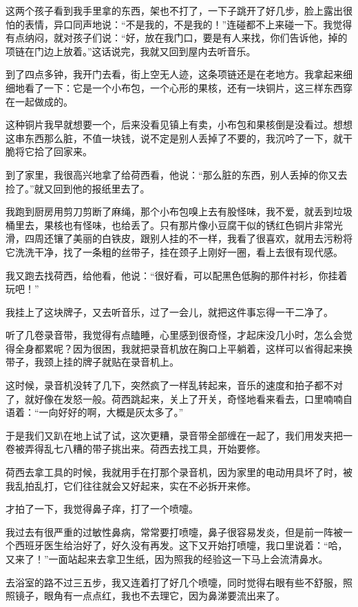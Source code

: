 \par 这两个孩子看到我手里拿的东西，架也不打了，一下子跳开了好几步，脸上露出很怕的表情，异口同声地说：“不是我的，不是我的！”连碰都不上来碰一下。我觉得有点纳闷，就对孩子们说：“好，放在我门口，要是有人来找，你们告诉他，掉的项链在门边上放着。”这话说完，我就又回到屋内去听音乐。
\par 到了四点多钟，我开门去看，街上空无人迹，这条项链还是在老地方。我拿起来细细地看了一下：它是一个小布包，一个心形的果核，还有一块铜片，这三样东西穿在一起做成的。
\par 这种铜片我早就想要一个，后来没看见镇上有卖，小布包和果核倒是没看过。想想这串东西那么脏，不值一块钱，说不定是别人丢掉了不要的，我沉吟了一下，就干脆将它拾了回家来。
\par 到了家里，我很高兴地拿了给荷西看，他说：“那么脏的东西，别人丢掉的你又去捡了。”就又回到他的报纸里去了。
\par 我跑到厨房用剪刀剪断了麻绳，那个小布包嗅上去有股怪味，我不爱，就丢到垃圾桶里去，果核也有怪味，也给丢了。只有那片像小豆腐干似的锈红色铜片非常光滑，四周还镶了美丽的白铁皮，跟别人挂的不一样，我看了很喜欢，就用去污粉将它洗洗干净，找了一条粗的丝带子，挂在颈子上刚好一圈，看上去很有现代感。
\par 我又跑去找荷西，给他看，他说：“很好看，可以配黑色低胸的那件衬衫，你挂着玩吧！”
\par 我挂上了这块牌子，又去听音乐，过了一会儿，就把这件事忘得一干二净了。
\par 听了几卷录音带，我觉得有点瞌睡，心里感到很奇怪，才起床没几小时，怎么会觉得全身都累呢？因为很困，我就把录音机放在胸口上平躺着，这样可以省得起来换带子，我颈上挂的牌子就贴在录音机上。
\par 这时候，录音机没转了几下，突然疯了一样乱转起来，音乐的速度和拍子都不对了，就好像在发怒一般。荷西跳起来，关上了开关，奇怪地看来看去，口里喃喃自语着：“一向好好的啊，大概是灰太多了。”
\par 于是我们又趴在地上试了试，这次更糟，录音带全部缠在一起了，我们用发夹把一卷被弄得乱七八糟的带子挑出来。荷西去找工具，开始要修。
\par 荷西去拿工具的时候，我就用手在打那个录音机，因为家里的电动用具坏了时，被我乱拍乱打，它们往往就会又好起来，实在不必拆开来修。
\par 才拍了一下，我觉得鼻子痒，打了一个喷嚏。
\par 我过去有很严重的过敏性鼻病，常常要打喷嚏，鼻子很容易发炎，但是前一阵被一个西班牙医生给治好了，好久没有再发。这下又开始打喷嚏，我口里说着：“哈，又来了！”一面站起来去拿卫生纸，因为照我的经验这一下马上会流清鼻水。
\par 去浴室的路不过三五步，我又连着打了好几个喷嚏，同时觉得右眼有些不舒服，照照镜子，眼角有一点点红，我也不去理它，因为鼻涕要流出来了。
